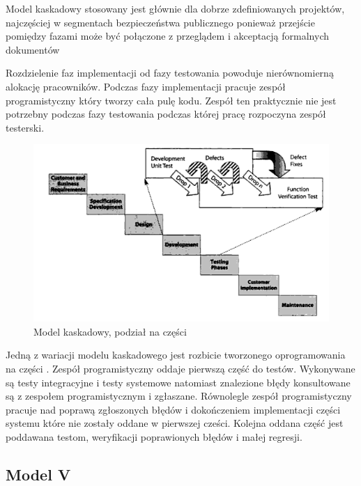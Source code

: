 Model kaskadowy stosowany jest głównie dla dobrze zdefiniowanych projektów, najczęściej w segmentach bezpieczeństwa publicznego ponieważ przejście pomiędzy fazami może być połączone z przeglądem i akceptacją formalnych dokumentów

Rozdzielenie faz implementacji od fazy testowania powoduje nierównomierną alokację pracowników. Podczas fazy implementacji pracuje zespół programistyczny który tworzy cała pulę kodu. Zespół ten praktycznie nie jest potrzebny podczas fazy testowania podczas której pracę rozpoczyna zespół testerski.
\begin{figure}[h]
\centerline{\includegraphics[scale=0.5]{img/water-wheel.png}}
\caption{Model kaskadowy, podział na części  \cite{TestingMatt}}
\label{fig:kaskadowyCzesci}
\end{figure}

Jedną z wariacji modelu kaskadowego jest rozbicie tworzonego oprogramowania na części \cite{TestingMatt}. 
Zespół programistyczny oddaje pierwszą część do testów. Wykonywane są testy integracyjne i testy systemowe natomiast znalezione błędy konsultowane są z zespołem programistycznym i zgłaszane. Równolegle zespół programistyczny pracuje nad poprawą zgłoszonych błędów i dokończeniem implementacji części systemu które nie zostały oddane w pierwszej cześci. Kolejna oddana część jest poddawana testom, weryfikacji poprawionych błędów i małej regresji.

 
 
\subsection{Model V}

